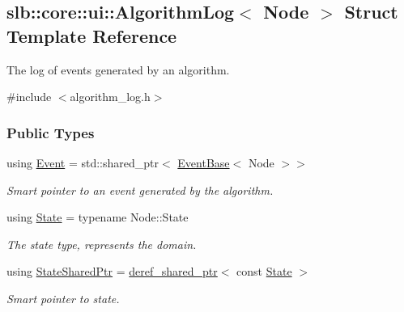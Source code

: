 \hypertarget{structslb_1_1core_1_1ui_1_1AlgorithmLog}{}\subsection{slb\+:\+:core\+:\+:ui\+:\+:Algorithm\+Log$<$ Node $>$ Struct Template Reference}
\label{structslb_1_1core_1_1ui_1_1AlgorithmLog}


The log of events generated by an algorithm.  




{\ttfamily \#include $<$algorithm\+\_\+log.\+h$>$}

\subsubsection*{Public Types}
\begin{DoxyCompactItemize}
\item 
using \hyperlink{structslb_1_1core_1_1ui_1_1AlgorithmLog_aa495893d6c587c69280c82dd4f1684ff}{Event} = std\+::shared\+\_\+ptr$<$ \hyperlink{structslb_1_1core_1_1ui_1_1EventBase}{Event\+Base}$<$ Node $>$$>$\hypertarget{structslb_1_1core_1_1ui_1_1AlgorithmLog_aa495893d6c587c69280c82dd4f1684ff}{}\label{structslb_1_1core_1_1ui_1_1AlgorithmLog_aa495893d6c587c69280c82dd4f1684ff}

\begin{DoxyCompactList}\small\item\em Smart pointer to an event generated by the algorithm. \end{DoxyCompactList}\item 
using \hyperlink{structslb_1_1core_1_1ui_1_1AlgorithmLog_ac9bad13ba3a1f7a8d1b545a86897b0b4}{State} = typename Node\+::\+State\hypertarget{structslb_1_1core_1_1ui_1_1AlgorithmLog_ac9bad13ba3a1f7a8d1b545a86897b0b4}{}\label{structslb_1_1core_1_1ui_1_1AlgorithmLog_ac9bad13ba3a1f7a8d1b545a86897b0b4}

\begin{DoxyCompactList}\small\item\em The state type, represents the domain. \end{DoxyCompactList}\item 
using \hyperlink{structslb_1_1core_1_1ui_1_1AlgorithmLog_acb46cb3c44c97ddbb219e4c0120e87e3}{State\+Shared\+Ptr} = \hyperlink{classslb_1_1core_1_1util_1_1deref__shared__ptr}{deref\+\_\+shared\+\_\+ptr}$<$ const \hyperlink{structslb_1_1core_1_1ui_1_1AlgorithmLog_ac9bad13ba3a1f7a8d1b545a86897b0b4}{State} $>$\hypertarget{structslb_1_1core_1_1ui_1_1AlgorithmLog_acb46cb3c44c97ddbb219e4c0120e87e3}{}\label{structslb_1_1core_1_1ui_1_1AlgorithmLog_acb46cb3c44c97ddbb219e4c0120e87e3}

\begin{DoxyCompactList}\small\item\em Smart pointer to state. \end{DoxyCompactList}\end{DoxyCompactItemize}
